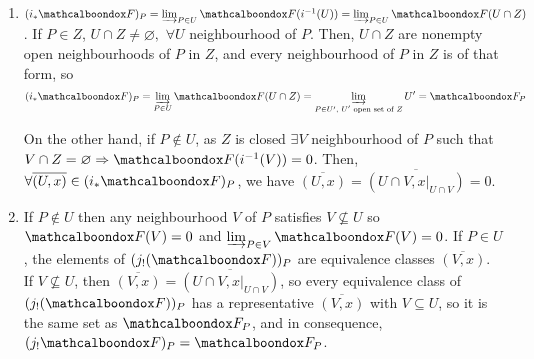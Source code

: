\begin{sol}
	\begin{enumerate}[label=\alph*)]
		\item $(i_{*}\sF)_P = \varinjlim_{P \in U} \sF(i^{-1}(U)) = \varinjlim_{P \in U} \sF(U \cap Z)$. If $P \in Z$, $U \cap Z \neq \varnothing, \, \, \forall U$ neighbourhood of $P$. Then, $U \cap Z$ are nonempty open neighbourhoods of $P$ in $Z$, and every neighbourhood of $P$ in $Z$ is of that form, so 
		\[
			(i_{*}\sF)_P = \varinjlim_{P \in U} \sF(U \cap Z) = \varinjlim_{P \in U', \text{ $U'$ open set of $Z$}} U' = \sF_P
		\]

		On the other hand, if $P \notin U$, as $Z$ is closed $\exists V$ neighbourhood of $P$ such that $V \cap Z = \varnothing \imp \sF(i^{-1}(V)) = 0$. Then, $\forall \overline{(U,x)} \in (i_{*}\sF)_P$, we have $\overline{(U,x)} = \overline{(U \cap V, x|_{U\cap V})} = 0$.

		\item If $P \notin U$ then any neighbourhood $V$ of $P$ satisfies $V \not\subseteq U$ so $\sF(V) = 0$ and $\varinjlim_{P \in V} \sF(V) = 0$. If $P \in U$, the elements of $(j_{!}(\sF))_P$ are equivalence classes $\overline{(V,x)}$. If $V \not\subseteq U$, then $\overline{(V,x)} = \overline{(U \cap V, x|_{U\cap V})}$, so every equivalence class of $(j_{!}(\sF))_P$ has a representative $\overline{(V,x)}$ with $V \subseteq U$, so it is the same set as $\sF_P$, and in consequence, $(j_{!}\sF)_P = \sF_P$.


\end{enumerate}
\end{sol}
